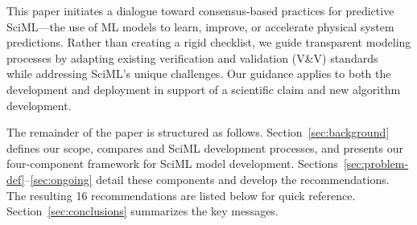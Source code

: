 This paper initiates a dialogue toward consensus-based practices for predictive SciML—the use of ML models to learn, improve, or accelerate physical system predictions. Rather than creating a rigid checklist, we guide transparent modeling processes by adapting existing \CSE{} verification and validation (V\&V) standards~\cite{AIAA_validation_report_1998,VV10-2006,Oberkampf_T_PAS_2002} while addressing SciML's unique challenges. Our guidance applies to both the development and deployment in support of a scientific claim and new algorithm development.

The remainder of the paper is structured as follows. Section~\ref{sec:background} defines our scope, compares \CSE{} and SciML development processes, and presents our four-component framework for SciML model development.
Sections~\ref{sec:problem-def}--\ref{sec:ongoing} detail these components and develop the recommendations.
The resulting 16 recommendations are listed below for quick reference.
Section~\ref{sec:conclusions} summarizes the key messages.


